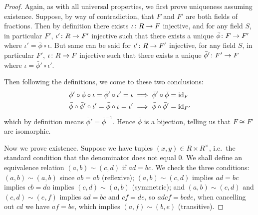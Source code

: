 \begin{proof}
    Again, as with all universal properties,
    we first prove uniqueness assuming existence.
    Suppose, by way of contradiction,
    that \(F\) and \(F'\) are both fields of fractions.
    Then by definition there exists \(\iota\colon R\to F\) injective,
    and for any field \(S\), in particular \(F'\),
    \(\iota'\colon R\to F'\) injective
    such that there exists a unique \(\bar{\phi}\colon F\to F'\)
    where \(\iota' = \bar{\phi}\circ\iota\).
    But same can be said for \(\iota'\colon R\to F'\) injective,
    for any field \(S\), in particular \(F'\),
    \(\iota\colon R\to F\) injective
    such that there exists a unique \(\bar{\phi}'\colon F'\to F\)
    where \(\iota = \bar{\phi}'\circ\iota'\).
    \begin{center}
    \end{center}

    Then following the definitions,
    we come to these two conclusions:
    \begin{align*}
        \bar{\phi}'\circ\bar{\phi}\circ\iota = \bar{\phi}'\circ\iota' = \iota
        &\implies \bar{\phi}'\circ\bar{\phi} = \operatorname{id}_F \\
        \bar{\phi}\circ\bar{\phi}'\circ\iota' = \bar{\phi}\circ\iota = \iota'
        &\implies \bar{\phi}\circ\bar{\phi}' = \operatorname{id}_{F'}
    \end{align*}
    which by definition means \(\bar{\phi}' = \bar{\phi}^{-1}\).
    Hence \(\bar{\phi}\) is a bijection,
    telling us that \(F \cong F'\) are isomorphic.

    Now we prove existence.
    Suppose we have tuples \((x,y) \in R \times R^\times\),
    i.e.\ the standard condition that the denominator does not equal 0.
    We shall define an equivalence relation
    \((a,b) \sim (c,d)\) if \(ad = bc\).
    We check the three conditions:
    \((a,b) \sim (a,b)\) since \(ab = ab\) (reflexive);
    \((a,b) \sim (c,d)\) implies \(ad = bc\)
    implies \(cb = da\) implies \((c,d) \sim (a,b)\) (symmetric);
    and \((a,b) \sim (c,d)\) and \((c,d) \sim (e,f)\)
    implies \(ad = bc\) and \(cf = de\),
    so \(adcf = bcde\), when cancelling out \(cd\) we have \(af = be\),
    which implies \((a,f) \sim (b,e)\) (transitive).


\end{proof}

